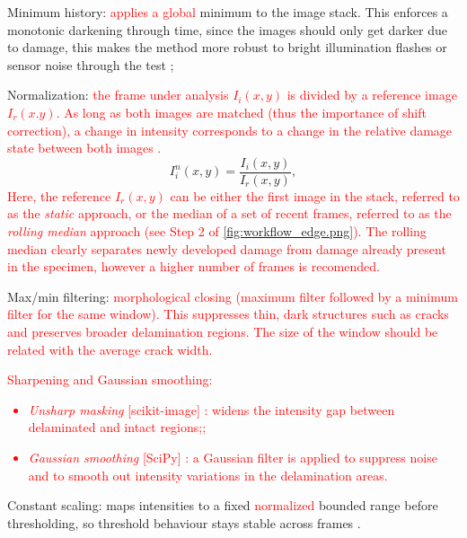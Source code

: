 \documentclass[final,5p,times]{elsarticle}
\newcommand{\revision}[1]{\textcolor{red}{#1}}
\begin{document}
	\begin{enumerate}
		\item Minimum history: \revision{applies a global} minimum to the image stack. This enforces a monotonic darkening through time, since the images should only get darker due to damage, this makes the method more robust to bright illumination flashes or sensor noise through the test \cite{benderEffectVariableAmplitude2021};
		\item Normalization: \revision{the frame under analysis $I_i (x,y)$ is divided by a reference image $I_r (x.y)$. As long as both images are matched (thus the importance of shift correction), a change in intensity corresponds to a change in the relative damage state between both images \cite{benderEffectVariableAmplitude2021, JustKochGude2022}.} 
		\begin{equation}
			I^n_i (x,y) = \frac{I_i(x,y)}{I_r(x,y)},
			\label{eq:normalization}
		\end{equation}
		\revision{Here, the reference $I_r(x,y)$ can be either the first image in the stack, referred to as the \emph{static} approach, or the median of a set of recent frames, referred to as the \emph{rolling median} approach (see Step 2 of \autoref{fig:workflow_edge.png}). The rolling median clearly separates newly developed damage from damage already present in the specimen, however a higher number of frames is recomended.}
		\item Max/min filtering: \revision{morphological closing (maximum filter followed by a minimum filter for the same window). This suppresses thin, dark structures such as cracks and preserves broader delamination regions. The size of the window should be related with the average crack width.}
		\revision{
			\item Sharpening and Gaussian smoothing:
			\begin{itemize}
				\item \emph{Unsharp masking} [scikit-image] \cite{van2014scikit}: widens the intensity gap between delaminated and intact regions;;
				\item \emph{Gaussian smoothing} [SciPy] \cite{virtanenSciPy10Fundamental2020}: a Gaussian filter is applied to suppress noise and to smooth out intensity variations in the delamination areas.
		\end{itemize}}
		\item Constant scaling:  maps intensities to a fixed \revision{normalized} bounded range before thresholding, so threshold behaviour stays stable across frames \cite{bakMethodAutomatedDigital2020}.

\end{enumerate}
\end{document}
